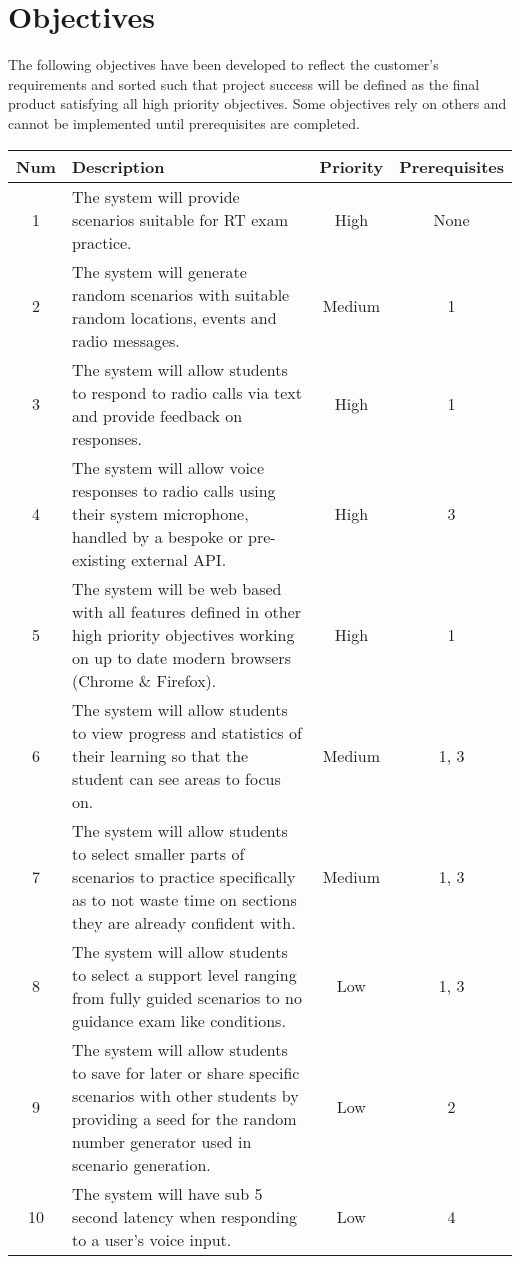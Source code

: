 \section{Objectives}
The following objectives have been developed to reflect the customer's requirements and sorted such that project success will be defined as the final product satisfying all high priority objectives. Some objectives rely on others and cannot be implemented until prerequisites are completed.

\begin{center}
    \begin{tabular}{ | c | m{24em} | c | c | }
        \hline
        \bf{Num} & \bf{Description} & \bf{Priority} & \bf{Prerequisites} \\
        \hline
        1 & The system will provide scenarios suitable for RT exam practice. & High & None \\
        \hline
        2 & The system will generate random scenarios with suitable random locations, events and radio messages. & Medium & 1 \\
        \hline
        3 & The system will allow students to respond to radio calls via text and provide feedback on responses. & High & 1 \\
        \hline
        4 & The system will allow voice responses to radio calls using their system microphone, handled by a bespoke or pre-existing external API. & High & 3 \\
        \hline
        5 & The system will be web based with all features defined in other high priority objectives working on up to date modern browsers (Chrome \& Firefox). & High & 1 \\
        \hline
        6 & The system will allow students to view progress and statistics of their learning so that the student can see areas to focus on. & Medium & 1, 3 \\
        \hline
        7 & The system will allow students to select smaller parts of scenarios to practice specifically as to not waste time on sections they are already confident with. & Medium & 1, 3 \\
        \hline
        8 & The system will allow students to select a support level ranging from fully guided scenarios to no guidance exam like conditions. & Low & 1, 3 \\
        \hline
        9 & The system will allow students to save for later or share specific scenarios with other students by providing a seed for the random number generator used in scenario generation. & Low & 2 \\
        \hline
        10 & The system will have sub 5 second latency when responding to a user's voice input. & Low & 4 \\
        \hline
    \end{tabular}
\end{center}